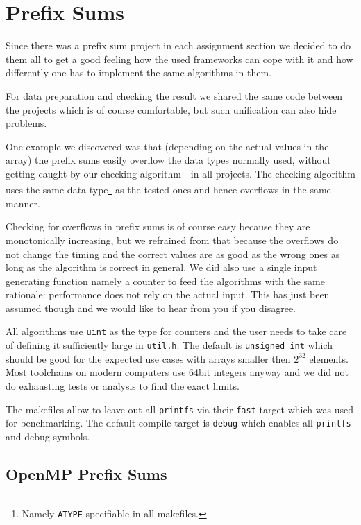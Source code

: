 \chapter{Prefix Sums}

Since there was a prefix sum project in each assignment section we decided to do them all to get a good feeling how the used frameworks can cope with it and how differently one has to implement the same algorithms in them.

For data preparation and checking the result we shared the same code between the projects which is of course comfortable, but such unification can also hide problems.

One example we discovered was that (depending on the actual values in the array) the prefix sums easily overflow the data types normally used, without getting caught by our checking algorithm - in all projects.
The checking algorithm uses the same data type\footnote{Namely \texttt{ATYPE} specifiable in all makefiles.} as the tested ones and hence overflows in the same manner.

Checking for overflows in prefix sums is of course easy because they are monotonically increasing, but we refrained from that because the overflows do not change the timing and the correct values are as good as the wrong ones as long as the algorithm is correct in general.
We did also use a single input generating function namely a counter to feed the algorithms with the same rationale: performance does not rely on the actual input.
This has just been assumed though and we would like to hear from you if you disagree.

All algorithms use \texttt{uint} as the type for counters and the user needs to take care of defining it sufficiently large in \texttt{util.h}.
The default is \texttt{unsigned int} which should be good for the expected use cases with arrays smaller then $2^{32}$ elements.
Most toolchains on modern computers use 64bit integers anyway and we did not do exhausting tests or analysis to find the exact limits.

The makefiles allow to leave out all \texttt{printfs} via their \texttt{fast} target which was used for benchmarking.
The default compile target is \texttt{debug} which enables all \texttt{printfs} and debug symbols.

\section{OpenMP Prefix Sums}

